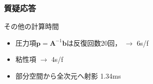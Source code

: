\documentclass[aspectratio=169,dvipdfmx,hyperref={bookmarks=true}]{beamer}
\begin{document}
\begin{thebibliography}{99}
\begin{frame}
\end{frame}
  
 \begin{frame}
 \frametitle{質疑応答}
\begin{block}{その他の計算時間}
\begin{itemize}
	\item 圧力項$\bm{p} = \bm{A}^{-1}\bm{b}$は反復回数20回， $\to$ 6\textmu s/f
	\item 粘性項 $\to$ 4\textmu s/f
	\item 部分空間から全次元へ射影 1.34ms
\end{itemize}
\end{block}
\end{frame}

\end{thebibliography}
\end{document}
